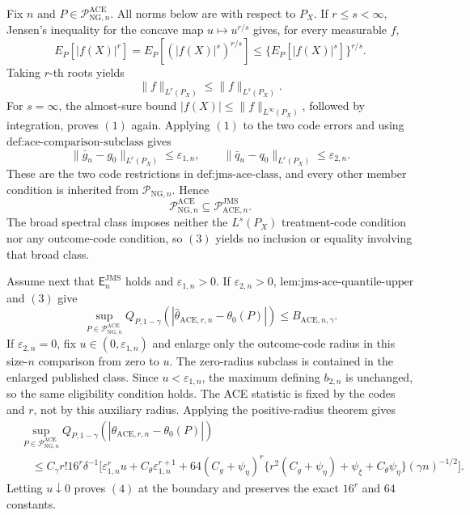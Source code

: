 Fix \(n\) and \(P\in\mathcal P_{\mathrm{NG},n}^{\mathrm{ACE}}\).  All norms below are with respect to \(P_X\).  If \(r\le s<\infty\), Jensen's inequality for the concave map \(u\mapsto u^{r/s}\) gives, for every measurable \(f\),
\[
 E_P[|f(X)|^r]
 =E_P[(|f(X)|^s)^{r/s}]
 \le\{E_P[|f(X)|^s]\}^{r/s}.
\]
Taking \(r\)-th roots yields
\[
 \lVert f\rVert_{L^r(P_X)}\le\lVert f\rVert_{L^s(P_X)}. \tag{1}
\]
For \(s=\infty\), the almost-sure bound \(|f(X)|\le\lVert f\rVert_{L^\infty(P_X)}\), followed by integration, proves \((1)\) again.  Applying \((1)\) to the two code errors and using \(\text{def:ace-comparison-subclass}\) gives
\[
 \lVert\bar g_n-g_0\rVert_{L^r(P_X)}\le\varepsilon_{1,n},
 \qquad
 \lVert\bar q_n-q_0\rVert_{L^r(P_X)}\le\varepsilon_{2,n}. \tag{2}
\]
These are the two code restrictions in \(\text{def:jms-ace-class}\), and every other member condition is inherited from \(\mathcal P_{\mathrm{NG},n}\).  Hence
\[
 \mathcal P_{\mathrm{NG},n}^{\mathrm{ACE}}
 \subseteq\mathcal P_{\mathrm{ACE},n}^{\mathrm{JMS}}. \tag{3}
\]
The broad spectral class imposes neither the \(L^s(P_X)\) treatment-code condition nor any outcome-code condition, so \((3)\) yields no inclusion or equality involving that broad class.

Assume next that \(\mathsf E_n^{\mathrm{JMS}}\) holds and \(\varepsilon_{1,n}>0\).  If \(\varepsilon_{2,n}>0\), \(\text{lem:jms-ace-quantile-upper}\) and \((3)\) give
\[
 \sup_{P\in\mathcal P_{\mathrm{NG},n}^{\mathrm{ACE}}}
 Q_{P,1-\gamma}(|\widehat\theta_{\mathrm{ACE},r,n}-\theta_0(P)|)
 \le B_{\mathrm{ACE},n,\gamma}. \tag{4}
\]
If \(\varepsilon_{2,n}=0\), fix \(u\in(0,\varepsilon_{1,n})\) and enlarge only the outcome-code radius in this size-\(n\) comparison from zero to \(u\).  The zero-radius subclass is contained in the enlarged published class.  Since \(u<\varepsilon_{1,n}\), the maximum defining \(b_{2,n}\) is unchanged, so the same eligibility condition holds.  The ACE statistic is fixed by the codes and \(r\), not by this auxiliary radius.  Applying the positive-radius theorem gives
\[
 \begin{aligned}
 &\sup_{P\in\mathcal P_{\mathrm{NG},n}^{\mathrm{ACE}}}
 Q_{P,1-\gamma}(|\widehat\theta_{\mathrm{ACE},r,n}-\theta_0(P)|)\\
 &\quad\le C_\gamma r!16^r\delta^{-1}
 \Big[\varepsilon_{1,n}^ru+C_\theta\varepsilon_{1,n}^{r+1}
 +64(C_g+\psi_\eta)^r
 \{r^2(C_g+\psi_\eta)+\psi_\xi+C_\theta\psi_\eta\}
 (\gamma n)^{-1/2}\Big].
 \end{aligned}
\]
Letting \(u\downarrow0\) proves \((4)\) at the boundary and preserves the exact \(16^r\) and \(64\) constants.

